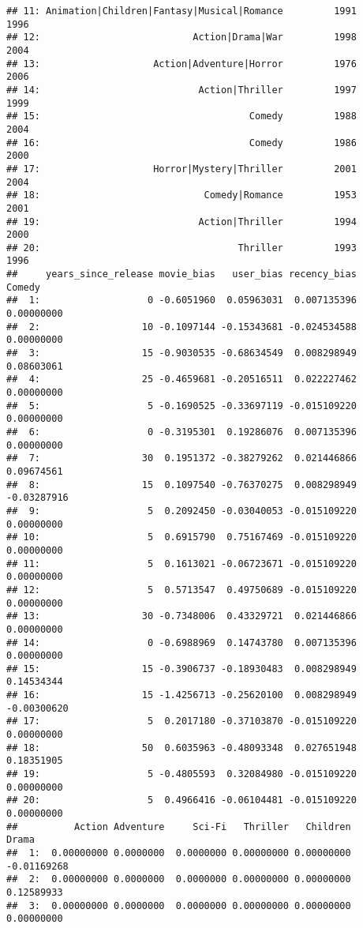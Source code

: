 \documentclass[
]{article}
\begin{document}
\begin{verbatim}
## 11: Animation|Children|Fantasy|Musical|Romance         1991        1996
## 12:                           Action|Drama|War         1998        2004
## 13:                    Action|Adventure|Horror         1976        2006
## 14:                            Action|Thriller         1997        1999
## 15:                                     Comedy         1988        2004
## 16:                                     Comedy         1986        2000
## 17:                    Horror|Mystery|Thriller         2001        2004
## 18:                             Comedy|Romance         1953        2001
## 19:                            Action|Thriller         1994        2000
## 20:                                   Thriller         1993        1996
##     years_since_release movie_bias   user_bias recency_bias      Comedy
##  1:                   0 -0.6051960  0.05963031  0.007135396  0.00000000
##  2:                  10 -0.1097144 -0.15343681 -0.024534588  0.00000000
##  3:                  15 -0.9030535 -0.68634549  0.008298949  0.08603061
##  4:                  25 -0.4659681 -0.20516511  0.022227462  0.00000000
##  5:                   5 -0.1690525 -0.33697119 -0.015109220  0.00000000
##  6:                   0 -0.3195301  0.19286076  0.007135396  0.00000000
##  7:                  30  0.1951372 -0.38279262  0.021446866  0.09674561
##  8:                  15  0.1097540 -0.76370275  0.008298949 -0.03287916
##  9:                   5  0.2092450 -0.03040053 -0.015109220  0.00000000
## 10:                   5  0.6915790  0.75167469 -0.015109220  0.00000000
## 11:                   5  0.1613021 -0.06723671 -0.015109220  0.00000000
## 12:                   5  0.5713547  0.49750689 -0.015109220  0.00000000
## 13:                  30 -0.7348006  0.43329721  0.021446866  0.00000000
## 14:                   0 -0.6988969  0.14743780  0.007135396  0.00000000
## 15:                  15 -0.3906737 -0.18930483  0.008298949  0.14534344
## 16:                  15 -1.4256713 -0.25620100  0.008298949 -0.00300620
## 17:                   5  0.2017180 -0.37103870 -0.015109220  0.00000000
## 18:                  50  0.6035963 -0.48093348  0.027651948  0.18351905
## 19:                   5 -0.4805593  0.32084980 -0.015109220  0.00000000
## 20:                   5  0.4966416 -0.06104481 -0.015109220  0.00000000
##          Action Adventure     Sci-Fi   Thriller   Children       Drama
##  1:  0.00000000 0.0000000  0.0000000 0.00000000 0.00000000 -0.01169268
##  2:  0.00000000 0.0000000  0.0000000 0.00000000 0.00000000  0.12589933
##  3:  0.00000000 0.0000000  0.0000000 0.00000000 0.00000000  0.00000000

\end{verbatim}
\end{document}
